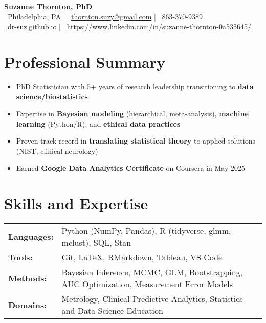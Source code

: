 \documentclass[10pt]{article}
\begin{document}
\begin{center}
    {\Huge\bfseries Suzanne Thornton, PhD} \\[5pt]
    {\large\color{secondary}
    \faMapMarker\ Philadelphia, PA \hspace{0.5em} | \hspace{0.5em}
    \faEnvelope\ \href{mailto:thornton.suzy@gmail.com}{thornton.suzy@gmail.com} \hspace{0.5em} | \hspace{0.5em}
    \faPhone\ 863-370-9389 \\[5pt]
    \faGithub\ \href{https://dr-suz.github.io}{dr-suz.github.io} \hspace{0.5em} | \hspace{0.5em}
    \faLinkedin\ \href{https://www.linkedin.com/in/suzanne-thornton-0a535645/}{https://www.linkedin.com/in/suzanne-thornton-0a535645/} 
    }
\end{center}

\section*{Professional Summary} %
\begin{itemize}[leftmargin=*,nosep]
    \item PhD Statistician with 5+ years of research leadership transitioning to \textbf{data science/biostatistics}
    \item Expertise in \textbf{Bayesian modeling} (hierarchical, meta-analysis), \textbf{machine learning} (Python/R), and \textbf{ethical data practices}
    \item Proven track record in \textbf{translating statistical theory} to applied solutions (NIST, clinical neurology)
    \item Earned \textbf{Google Data Analytics Certificate} on Coursera in May 2025
\end{itemize}

\section*{Skills and Expertise}
\begin{tabular}{@{}ll@{}}
    \textbf{Languages:} & Python (NumPy, Pandas), R (tidyverse, glmm, mclust), SQL, Stan \\
    \textbf{Tools:} & Git, LaTeX, RMarkdown, Tableau, VS Code \\
    \textbf{Methods:} & Bayesian Inference, MCMC, GLM, Bootstrapping, AUC Optimization, Measurement Error Models \\
    \textbf{Domains:} & Metrology, Clinical Predictive Analytics, Statistics and Data Science Education  
\end{tabular}
\end{document}
